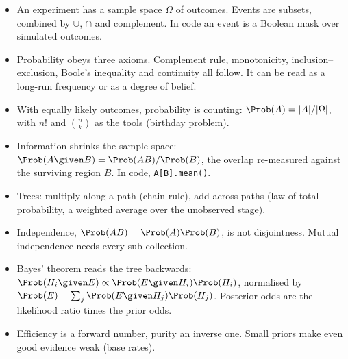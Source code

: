 \begin{recap}
\begin{itemize}[leftmargin=1.2em,itemsep=1pt]
  \item An experiment has a sample space $\Omega$ of outcomes. Events are subsets,
        combined by $\cup$, $\cap$ and complement. In code an event is a Boolean
        mask over simulated outcomes.
  \item Probability obeys three axioms. Complement rule, monotonicity,
        inclusion--exclusion, Boole's inequality and continuity all follow.
        It can be read as a long-run frequency or as a degree of belief.
  \item With equally likely outcomes, probability is counting:
        $\Prob(A)=|A|/|\Omega|$, with $n!$ and $\binom nk$ as the tools (birthday problem).
  \item Information shrinks the sample space: $\Prob(A\given B)=\Prob(AB)/\Prob(B)$,
        the overlap re-measured against the surviving region $B$. In code,
        \texttt{A[B].mean()}.
  \item Trees: multiply along a path (chain rule), add across paths (law of
        total probability, a weighted average over the unobserved stage).
  \item Independence, $\Prob(AB)=\Prob(A)\Prob(B)$, is not disjointness. Mutual
        independence needs every sub-collection.
  \item Bayes' theorem reads the tree backwards:
        $\Prob(H_i\given E)\propto\Prob(E\given H_i)\Prob(H_i)$, normalised by
        $\Prob(E)=\sum_j\Prob(E\given H_j)\Prob(H_j)$. Posterior odds are the
        likelihood ratio times the prior odds.
  \item Efficiency is a forward number, purity an inverse one. Small priors
        make even good evidence weak (base rates).
\end{itemize}
\end{recap}
\providecommand{\oneBEx}[1]{\par\medskip\noindent\refstepcounter{wex}\textbf{Example~\thewex\ifx\relax#1\relax\else\ (#1)\fi.}\ }
\providecommand{\OneBBernP}{}\renewcommand{\OneBBernP}{0.3}
\providecommand{\OneBBernFrac}{}\renewcommand{\OneBBernFrac}{0.3016}
\providecommand{\OneBNOmega}{}\renewcommand{\OneBNOmega}{10^5}
\providecommand{\OneBNExp}{}\renewcommand{\OneBNExp}{2\times10^{5}}
\providecommand{\OneBMeanX}{}\renewcommand{\OneBMeanX}{4.997}
\providecommand{\OneBMeanY}{}\renewcommand{\OneBMeanY}{2.796}
\providecommand{\OneBPXfive}{}\renewcommand{\OneBPXfive}{0.2467}
